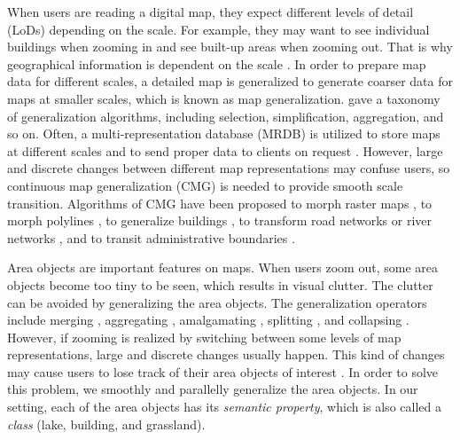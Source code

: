 \documentclass[]{interact}
\begin{document}


When users are reading a digital map,
they expect different levels of detail (LoDs) depending on the scale.
For example, they may want to see individual buildings when zooming in
and see built-up areas when zooming out.
That is why geographical information is dependent on the scale
\citep{Muller1995Generalization,Weibel1997}. 
In order to prepare map data for different scales,
a detailed map is generalized to generate coarser data 
for maps at smaller scales,
which is known as map generalization.
\citet{Mackaness2017Generalization} gave a taxonomy of 
generalization algorithms, 
including selection, simplification, aggregation, and so on.
Often, a multi-representation database (MRDB) is utilized to store
maps at different scales and to send proper data to clients on request
\citep[\eg][]{Hampe2004multiple}.
However, large and discrete changes between different map representations
may confuse users,
so continuous map generalization (CMG) is needed to
provide smooth scale transition.
Algorithms of CMG have been proposed 
to morph raster maps
\citep[\eg][]{Pantazis2009a,Pantazis2009b}, 
to morph polylines
\citep[\eg][]{Noellenburg2008,Peng2013LSA,Deng2015,Li2017Annealing,Li2018Fourier},
to generalize buildings
\citep[\eg][]{Li2017_Building,Peng2017Building,Touya2017Progressive},
to transform road networks or river networks
\citep[\eg][]{Suba2016Road,Chimani2014Eat,Huang2017Matrix,Peng2012River},
and to transit administrative boundaries
\citep[\eg][]{Peng2016Admin}.






Area objects are important features on maps. 
When users zoom out,
some area objects become too tiny to be seen,
which results in visual clutter.
The clutter can be avoided by generalizing the 
area objects.
The generalization operators include
merging \citep[\eg][]{HaunertWolff2010AreaAgg}, 
aggregating \citep[\eg][]{Shen2019Aggregation}, 
amalgamating \citep[\eg][]{Regnauld2007Amalgamation}, 
splitting \citep[\eg][]{Meijers2016Split}, 
and collapsing \citep[\eg][]{Haunert2008Skeleton}.
However, if zooming is realized by switching between
some levels of map representations, 
large and discrete changes usually happen.
This kind of changes may cause users to lose track of
their area objects of interest \citep{vanKreveld2001}.
In order to solve this problem, 
we smoothly and parallelly generalize the area objects.
In our setting, each of the area objects has its \emph{semantic property},
which is also called a \emph{class} (\eg lake, building, and grassland).
\end{document}

